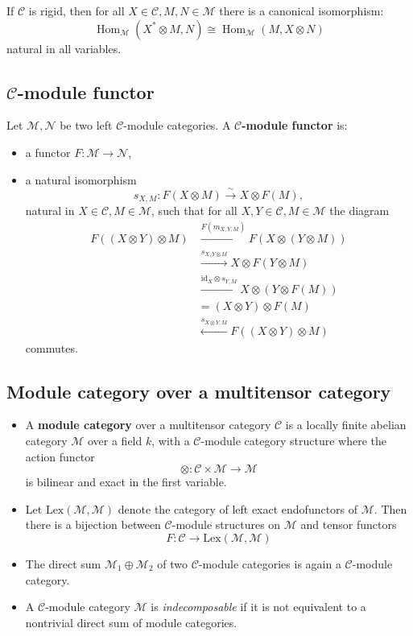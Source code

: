 \documentclass[11pt]{article}
\theoremstyle{definition}
\begin{document}
If \( \mathcal{C} \) is rigid, then for all \( X \in \mathcal{C}, M,N \in \mathcal{M} \) there is a canonical isomorphism:
\[
\operatorname{Hom}_{\mathcal{M}}(X^* \otimes M, N) \cong \operatorname{Hom}_{\mathcal{M}}(M, X \otimes N)
\]
natural in all variables.

\subsection{ \( \mathcal{C} \)-module functor}
Let \( \mathcal{M}, \mathcal{N} \) be two left \( \mathcal{C} \)-module categories. A \textbf{\( \mathcal{C} \)-module functor} is:
\begin{itemize}
  \item a functor \( F : \mathcal{M} \to \mathcal{N} \),
  \item a natural isomorphism
  \[
  s_{X,M} : F(X \otimes M) \xrightarrow{\sim} X \otimes F(M),
  \]
  natural in \( X \in \mathcal{C}, M \in \mathcal{M} \), such that for all \( X,Y \in \mathcal{C}, M \in \mathcal{M} \) the diagram
  \[
  \begin{aligned}
  F((X \otimes Y) \otimes M) &\xrightarrow{F(m_{X,Y,M})} F(X \otimes (Y \otimes M)) \\
  &\xrightarrow{s_{X,Y \otimes M}} X \otimes F(Y \otimes M) \\
  &\xrightarrow{\mathrm{id}_X \otimes s_{Y,M}} X \otimes (Y \otimes F(M)) \\
  &= (X \otimes Y) \otimes F(M) \\
  &\xleftarrow{s_{X \otimes Y, M}} F((X \otimes Y) \otimes M)
  \end{aligned}
  \]
  commutes.
\end{itemize}

\subsection{ Module category over a multitensor category}
\begin{itemize}
  \item A \textbf{module category} over a multitensor category \( \mathcal{C} \) is a locally finite abelian category \( \mathcal{M} \) over a field \( k \), with a \( \mathcal{C} \)-module category structure where the action functor
  \[ \otimes : \mathcal{C} \times \mathcal{M} \to \mathcal{M} \]
  is bilinear and exact in the first variable.

  \item Let \( \mathrm{Lex}(\mathcal{M},\mathcal{M}) \) denote the category of left exact endofunctors of \( \mathcal{M} \). Then there is a bijection between \( \mathcal{C} \)-module structures on \( \mathcal{M} \) and tensor functors
  \[ F : \mathcal{C} \to \mathrm{Lex}(\mathcal{M}, \mathcal{M}) \]

  \item The direct sum \( \mathcal{M}_1 \oplus \mathcal{M}_2 \) of two \( \mathcal{C} \)-module categories is again a \( \mathcal{C} \)-module category.

  \item A \( \mathcal{C} \)-module category \( \mathcal{M} \) is \emph{indecomposable} if it is not equivalent to a nontrivial direct sum of module categories.
\end{itemize}
\end{document}
